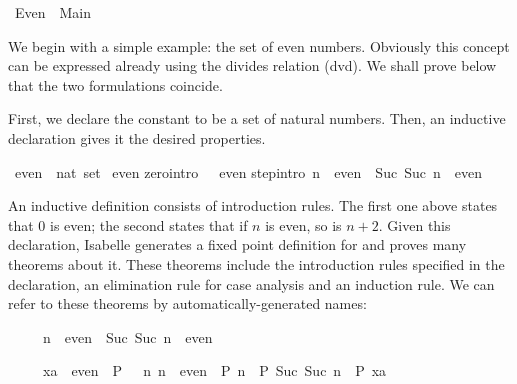 %
\begin{isabellebody}%
\def\isabellecontext{Even}%
\isanewline
{}\ Even\ {\isacharequal}\ Main{\isacharcolon}%
\begin{isamarkuptext}%
We begin with a simple example: the set of even numbers.  Obviously this
concept can be expressed already using the divides relation (dvd).  We shall
prove below that the two formulations coincide.

First, we declare the constant  to be a set of natural numbers.
Then, an inductive declaration gives it the desired properties.%
\end{isamarkuptext}%
\ even\ {\isacharcolon}{\isacharcolon}\ {\isachardoublequote}nat\ set{\isachardoublequote}\isanewline
{}\ even\isanewline
{}\isanewline
zero{\isacharbrackleft}intro{\isacharbang}{\isacharbrackright}{\isacharcolon}\ {\isachardoublequote}{}\ {\isasymin}\ even{\isachardoublequote}\isanewline
step{\isacharbrackleft}intro{\isacharbang}{\isacharbrackright}{\isacharcolon}\ {\isachardoublequote}n\ {\isasymin}\ even\ {\isasymLongrightarrow}\ {\isacharparenleft}Suc\ {\isacharparenleft}Suc\ n{\isacharparenright}{\isacharparenright}\ {\isasymin}\ even{\isachardoublequote}%
\begin{isamarkuptext}%
An inductive definition consists of introduction rules.  The first one
above states that 0 is even; the second states that if $n$ is even, so is
$n+2$.  Given this declaration, Isabelle generates a fixed point definition
for  and proves many theorems about it.  These theorems include the
introduction rules specified in the declaration, an elimination rule for case
analysis and an induction rule.  We can refer to these theorems by
automatically-generated names:

\begin{isabelle}%
\ \ \ \ \ n\ {\isasymin}\ even\ {\isasymLongrightarrow}\ Suc\ {\isacharparenleft}Suc\ n{\isacharparenright}\ {\isasymin}\ even%
\end{isabelle}

\begin{isabelle}%
\ \ \ \ \ xa\ {\isasymin}\ even\ {\isasymLongrightarrow}\ P\ {}\ {\isasymLongrightarrow}\ {\isacharparenleft}{\isasymAnd}n{\isachardot}\ n\ {\isasymin}\ even\ {\isasymLongrightarrow}\ P\ n\ {\isasymLongrightarrow}\ P\ {\isacharparenleft}Suc\ {\isacharparenleft}Suc\ n{\isacharparenright}{\isacharparenright}{\isacharparenright}\ {\isasymLongrightarrow}\ P\ xa%
\end{isabelle}


\end{isamarkuptext}
\end{isabellebody}
